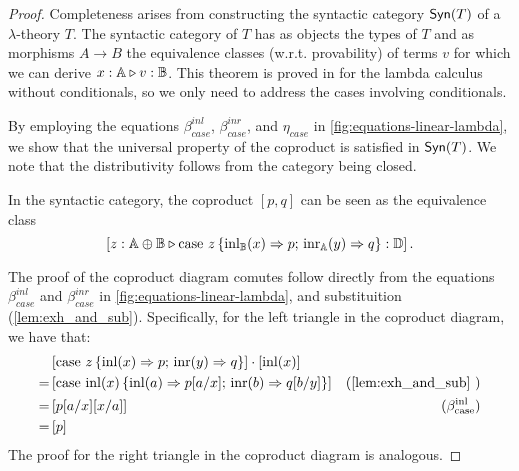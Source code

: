  \begin{proof}
   Completeness arises from constructing the syntactic category $\mathsf{Syn}(T)$ of a $\lambda$-theory $T$. The syntactic category of $T$ has as objects the types of $T$ and as morphisms $A \rightarrow B$ the equivalence classes (w.r.t. provability) of terms $v$ for which we can derive $x : \mathbb{A} \triangleright v : \mathbb{B}$.
   This theorem is proved in \cite[Lemma 2.6]{dahlqvist2023syntactic} for the lambda calculus without conditionals, so we only need to address the cases involving conditionals.

   By employing the equations $\beta_{case}^{inl}$, $\beta_{case}^{inr}$, and $\eta_{case}$  in \autoref{fig:equations-linear-lambda}, we show that the universal property of the coproduct is satisfied in $\mathsf{Syn}(T)$.  We note that the distributivity follows from the category being closed.

   In the syntactic category, the coproduct $[p , q]$ can be seen as the equivalence
  class 
 \begin{equation*}
  \left[z:\mathbb{A} \oplus\mathbb{B} \triangleright \text{case } z\,\{\mathrm{inl}_{\mathbb{B}}(x) \Rightarrow p ; \, \mathrm{inr}_{\mathbb{A}}(y) \Rightarrow q\}: \mathbb{D}\right].
 \end{equation*}

 The proof of the coproduct diagram comutes follow directly from the equations $\beta_{case}^{inl}$ and $\beta_{case}^{inr}$ in \autoref{fig:equations-linear-lambda}, and substituition (\autoref{lem:exh_and_sub}). Specifically, for the left triangle in the coproduct diagram, we have that:
  \begin{align*}
    & \left[\text{case } z\,\{\inl(x) \Rightarrow p ; \, \inr(y) \Rightarrow q\}\right] \comp \left[ \inl(x)\right]  \\
    = & \left[ \text{case } \inl(x) \,\{\inl(a) \Rightarrow p[a/x] ; \, \inr(b) \Rightarrow q[b/y]\} \right] & (\text{\autoref{lem:exh_and_sub} })  \\
    = &   \left[ p[a/x][x/a]  \right]& (\beta_{\text{case}}^{\text{inl}}) \\
    = & \left[ p \right] \\
  \end{align*}
  The proof for the right triangle in the coproduct diagram is analogous.


\end{proof}

